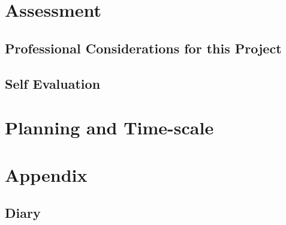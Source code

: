 \documentclass[]{project_interim}
\begin{document}
\chapter{Assessment}
\section{Professional Considerations for this Project}
\section{Self Evaluation}

\newpage
{}


\chapter{Planning and Time-scale}

\chapter{Appendix}
\section{Diary}
\end{document}
